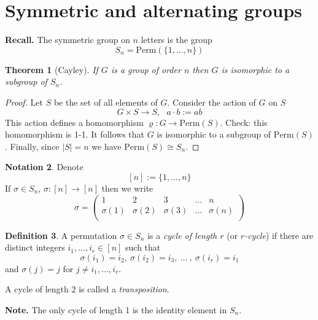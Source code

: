 \documentclass[12pt, letterpaper, oneside]{article}
\theoremstyle{plain}
\newtheorem{theorem}{Theorem}[section]
\theoremstyle{definition}
\newtheorem{definition}[theorem]{Definition}
\newtheorem{notation}[theorem]{Notation}
\newcommand{\Perm}{\mathrm{Perm}}
\newcommand{\vs}{\vskip 5mm}
\begin{document}
\newpage
\section{Symmetric and alternating groups}
\label{SEC_SYMALTGPS}


\textbf{Recall.} The symmetric group on $n$ letters is the group 
$$S_{n} = \Perm(\{1, \dots, n\})$$


\vs\vs


\begin{theorem}[Cayley]
If $G$ is a group of order $n$ then $G$ is isomorphic to a subgroup of $S_{n}$.
\end{theorem}

\vs 

\begin{proof}
Let $S$ be the set of all elements of $G$. Consider the action of $G$ on $S$
$$G \times S \to S, \ \ \ a\cdot b := ab$$
This action defines a homomorphism $\varrho \colon G \to \Perm(S)$. Check: this homomorphism 
is 1-1. It follows that $G$ is isomorphic to a subgroup of $\Perm(S)$. Finally, since $|S| = n$ 
we have $\Perm(S) \cong S_{n}$.
\end{proof}



\vs\vs

\begin{notation}
Denote 
$$[n] := \{1, \dots, n\}$$
If $\sigma \in S_{n}$, $\sigma\colon [n] \to [n]$ then we write
$$\sigma = 
\begin{pmatrix}
1 & 2 & 3 & \dots & n \\[2mm]
\sigma(1) & \sigma(2) & \sigma(3) & \dots & \sigma(n) \\
\end{pmatrix}
$$
\end{notation}

\vs\vs

\begin{definition}
A permutation $\sigma\in S_{n}$ is a \emph{cycle of length $r$} (or \emph{$r$-cycle}) if there are distinct integers 
$i_{1}, \dots, i_{r}\in [n]$ such that 
$$\sigma(i_{1}) = i_{2}, \ \sigma(i_{2}) = i_{3}, \ \dots\ , \ \sigma(i_{r}) = i_{1}$$
and $\sigma(j) = j$ for $j\neq i_{1}, \dots, i_{r}$.

A cycle of length 2 is called a \emph{transposition}. 
\end{definition}

\vs

\textbf{Note.} The only cycle of length 1 is the identity element in $S_{n}$.
\end{document}
